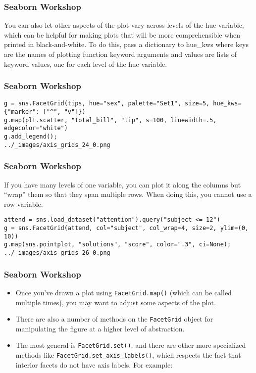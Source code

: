 \begin{frame}[fragile]
\frametitle{Seaborn Workshop}
\large

You can also let other aspects of the plot vary across levels of the hue variable, which can be helpful for making plots that will be more comprehensible when printed in black-and-white. To do this, pass a dictionary to hue_kws where keys are the names of plotting function keyword arguments and values are lists of keyword values, one for each level of the hue variable.
\end{frame}
\begin{frame}[fragile]
\frametitle{Seaborn Workshop}
\large
\begin{verbatim}
g = sns.FacetGrid(tips, hue="sex", palette="Set1", size=5, hue_kws={"marker": ["^", "v"]})
g.map(plt.scatter, "total_bill", "tip", s=100, linewidth=.5, edgecolor="white")
g.add_legend();
../_images/axis_grids_24_0.png
\end{verbatim}
\end{frame}
\begin{frame}[fragile]
\frametitle{Seaborn Workshop}
\large
If you have many levels of one variable, you can plot it along the columns but “wrap” them so that they span multiple rows. When doing this, you cannot use a row variable.

\begin{verbatim}
attend = sns.load_dataset("attention").query("subject <= 12")
g = sns.FacetGrid(attend, col="subject", col_wrap=4, size=2, ylim=(0, 10))
g.map(sns.pointplot, "solutions", "score", color=".3", ci=None);
../_images/axis_grids_26_0.png
\end{verbatim}
\end{frame}
\begin{frame}[fragile]
\frametitle{Seaborn Workshop}
\large
\begin{itemize}
\item Once you’ve drawn a plot using \texttt{FacetGrid.map()} (which can be called multiple times), you may want to adjust some aspects of the plot. 
\item There are also a number of methods on the \texttt{FacetGrid} object for manipulating the figure at a higher level of abstraction. \item The most general is \texttt{FacetGrid.set()}, and there are other more specialized methods like \texttt{FacetGrid.set\_axis\_labels()}, which respects the fact that interior facets do not have axis labels. For example:
\end{itemize}

\end{frame}
